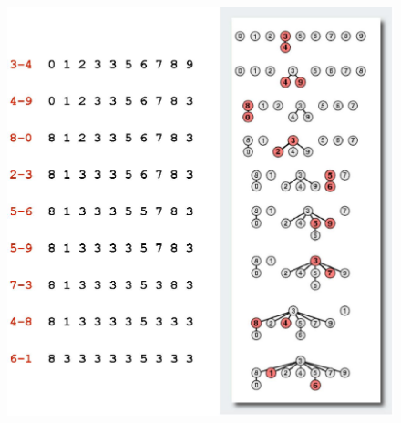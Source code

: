 \begin{figure}[h]
    \begin{center}
        \includegraphics[width=120mm]{spolecne/02/images/union-find}
    \end{center}
\end{figure}
